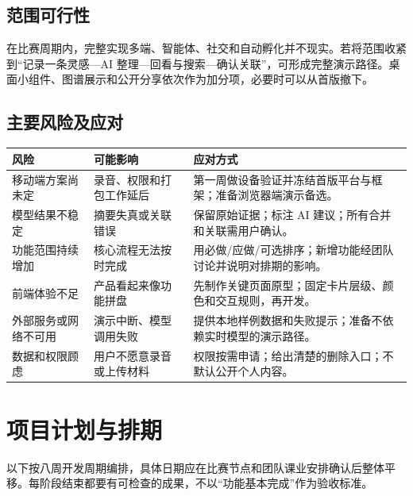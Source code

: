 \documentclass[UTF8,a4paper,12pt]{ctexart}
\begin{document}
\subsection{范围可行性}
在比赛周期内，完整实现多端、智能体、社交和自动孵化并不现实。若将范围收紧到“记录一条灵感—AI 整理—回看与搜索—确认关联”，可形成完整演示路径。桌面小组件、图谱展示和公开分享依次作为加分项，必要时可以从首版撤下。

\subsection{主要风险及应对}
\begin{tabularx}{\textwidth}{p{3.1cm} X X}
\toprule
风险 & 可能影响 & 应对方式\\
\midrule
移动端方案尚未定 & 录音、权限和打包工作延后 & 第一周做设备验证并冻结首版平台与框架；准备浏览器端演示备选。\\
模型结果不稳定 & 摘要失真或关联错误 & 保留原始证据；标注 AI 建议；所有合并和关联需用户确认。\\
功能范围持续增加 & 核心流程无法按时完成 & 用必做/应做/可选排序；新增功能经团队讨论并说明对排期的影响。\\
前端体验不足 & 产品看起来像功能拼盘 & 先制作关键页面原型；固定卡片层级、颜色和交互规则，再开发。\\
外部服务或网络不可用 & 演示中断、模型调用失败 & 提供本地样例数据和失败提示；准备不依赖实时模型的演示路径。\\
数据和权限顾虑 & 用户不愿意录音或上传材料 & 权限按需申请；给出清楚的删除入口；不默认公开个人内容。\\
\bottomrule
\end{tabularx}

\section{项目计划与排期}

以下按八周开发周期编排，具体日期应在比赛节点和团队课业安排确认后整体平移。每阶段结束都要有可检查的成果，不以“功能基本完成”作为验收标准。
\end{document}
